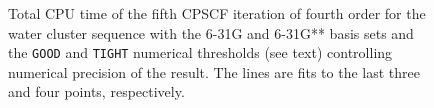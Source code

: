 \documentclass[prl,aps,preprint,showpacs,superbib]{revtex4}
\begin{document}
{\begin{figure}[h]
  \caption{\protect
    Total CPU time of the fifth CPSCF iteration of fourth order for
    the water cluster sequence with the 6-31G and 6-31G** 
    basis sets and the {\tt GOOD} and {\tt TIGHT} 
    numerical thresholds (see text) controlling numerical
    precision of the result. The lines are fits to the 
    last three and four points, respectively.
  }\label{fig:Gamma_scaling}
\end{figure}

}
\end{document}
